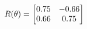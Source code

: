 \documentclass[preview]{standalone}
\begin{document}
\begin{align*}
\special{dvisvgm:raw <g id='unique000'>}R(\theta) = \begin{bmatrix}0.75 & -0.66\\0.66 & 0.75\end{bmatrix}\special{dvisvgm:raw </g>}
\end{align*}
\end{document}
